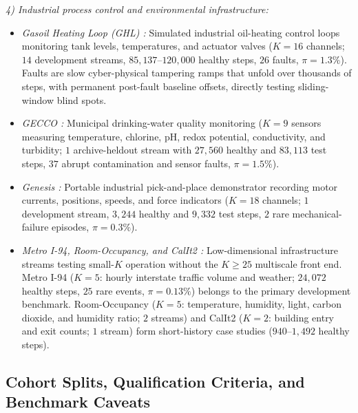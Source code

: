 \documentclass[journal]{IEEEtran}
\begin{document}
\noindent\emph{4) Industrial process control and environmental infrastructure:}
\begin{itemize}[leftmargin=*, nosep, itemsep=1.5pt]
    \item \emph{Gasoil Heating Loop (GHL) \cite{schmidl2022anomaly}:} Simulated industrial oil-heating control loops monitoring tank levels, temperatures, and actuator valves ($K{=}16$ channels; $14$ development streams, $85{,}137\text{--}120{,}000$ healthy steps, $26$ faults, $\pi{=}1.3\%$). Faults are slow cyber-physical tampering ramps that unfold over thousands of steps, with permanent post-fault baseline offsets, directly testing sliding-window blind spots.
    \item \emph{GECCO \cite{schmidl2022anomaly}:} Municipal drinking-water quality monitoring ($K{=}9$ sensors measuring temperature, chlorine, pH, redox potential, conductivity, and turbidity; $1$ archive-heldout stream with $27{,}560$ healthy and $83{,}113$ test steps, $37$ abrupt contamination and sensor faults, $\pi{=}1.5\%$).
    \item \emph{Genesis \cite{schmidl2022anomaly}:} Portable industrial pick-and-place demonstrator recording motor currents, positions, speeds, and force indicators ($K{=}18$ channels; $1$ development stream, $3{,}244$ healthy and $9{,}332$ test steps, $2$ rare mechanical-failure episodes, $\pi{=}0.3\%$).
    \item \emph{Metro I-94, Room-Occupancy, and CalIt2 \cite{candanedo2016accurate, asuncion2007uci, schmidl2022anomaly}:} Low-dimensional infrastructure streams testing small-$K$ operation without the $K{\ge}25$ multiscale front end. Metro I-94 ($K{=}5$: hourly interstate traffic volume and weather; $24{,}072$ healthy steps, $25$ rare events, $\pi{=}0.13\%$) belongs to the primary development benchmark. Room-Occupancy ($K{=}5$: temperature, humidity, light, carbon dioxide, and humidity ratio; $2$ streams) and CalIt2 ($K{=}2$: building entry and exit counts; $1$ stream) form short-history case studies ($940\text{--}1{,}492$ healthy steps).
\end{itemize}

\subsection{Cohort Splits, Qualification Criteria, and Benchmark Caveats}
\label{subsec:cohort_caveats}
\end{document}
